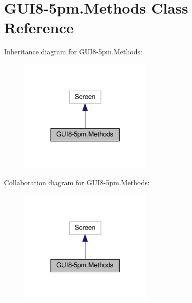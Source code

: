 \hypertarget{classGUI8-5pm_1_1Methods}{}\section{G\+U\+I8-\/5pm.Methods Class Reference}
\label{classGUI8-5pm_1_1Methods}


Inheritance diagram for G\+U\+I8-\/5pm.Methods\+:\nopagebreak
\begin{figure}[H]
\begin{center}
\leavevmode
\includegraphics[width=182pt]{classGUI8-5pm_1_1Methods__inherit__graph}
\end{center}
\end{figure}


Collaboration diagram for G\+U\+I8-\/5pm.Methods\+:\nopagebreak
\begin{figure}[H]
\begin{center}
\leavevmode
\includegraphics[width=182pt]{classGUI8-5pm_1_1Methods__coll__graph}
\end{center}
\end{figure}
